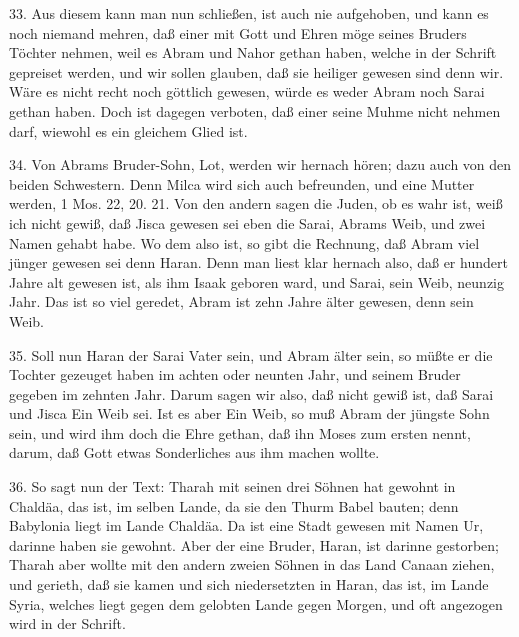 33. Aus diesem kann man nun schließen, ist auch nie aufgehoben, und kann es noch niemand mehren, daß einer mit Gott und Ehren möge seines Bruders Töchter nehmen, weil es Abram und Nahor gethan haben, welche in der Schrift gepreiset werden, und wir sollen glauben, daß sie heiliger gewesen sind denn wir. Wäre es nicht recht noch göttlich gewesen, würde es weder Abram noch Sarai gethan haben. Doch ist dagegen verboten, daß einer seine Muhme nicht nehmen darf, wiewohl es ein gleichem Glied ist.

34. Von Abrams Bruder-Sohn, Lot, werden wir hernach hören; dazu auch von den beiden Schwestern. Denn Milca wird sich auch befreunden, und eine Mutter werden, 1 Mos. 22, 20. 21. Von den andern sagen die Juden, ob es wahr ist, weiß ich nicht gewiß, daß Jisca gewesen sei eben die Sarai, Abrams Weib, und zwei Namen gehabt habe. Wo dem also ist, so gibt die Rechnung, daß Abram viel jünger gewesen sei denn Haran. Denn man liest klar hernach also, daß er hundert Jahre alt gewesen ist, als ihm Isaak geboren ward, und Sarai, sein Weib, neunzig Jahr. Das ist so viel geredet, Abram ist zehn Jahre älter gewesen, denn sein Weib.

35. Soll nun Haran der Sarai Vater sein, und Abram älter sein, so müßte er die Tochter gezeuget haben im achten oder neunten Jahr, und seinem Bruder gegeben im zehnten Jahr. Darum sagen wir also, daß nicht gewiß ist, daß Sarai und Jisca Ein Weib sei. Ist es aber Ein Weib, so muß Abram der jüngste Sohn sein, und wird ihm doch die Ehre gethan, daß ihn Moses zum ersten nennt, darum, daß Gott etwas Sonderliches aus ihm machen wollte.

36. So sagt nun der Text: Tharah mit seinen drei Söhnen hat gewohnt in Chaldäa, das ist, im selben Lande, da sie den Thurm Babel bauten; denn Babylonia liegt im Lande Chaldäa. Da ist eine Stadt gewesen mit Namen Ur, darinne haben sie gewohnt. Aber der eine Bruder, Haran, ist darinne gestorben; Tharah aber wollte mit den andern zweien Söhnen in das Land Canaan ziehen, und gerieth, daß sie kamen und sich niedersetzten in Haran, das ist, im Lande Syria, welches liegt gegen dem gelobten Lande gegen Morgen, und oft angezogen wird in der Schrift.

